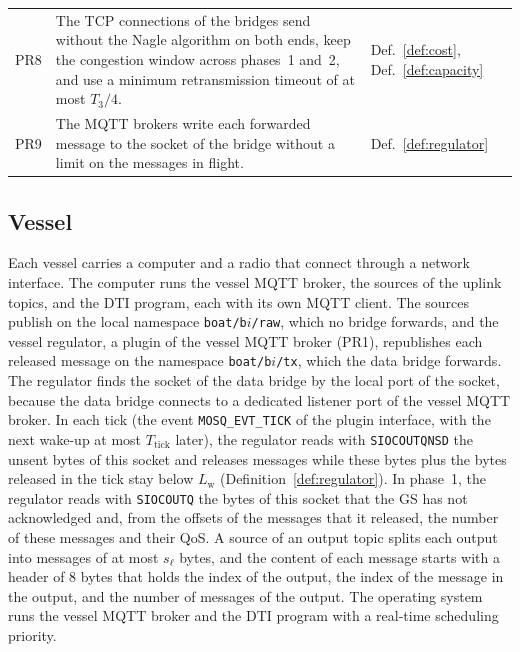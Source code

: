 \begin{table}[t]
\begin{tabular}{@{}lp{5.4cm}l@{}}
PR8 & The TCP connections of the bridges send without the Nagle algorithm on both ends, keep the congestion window across phases~1 and~2, and use a minimum retransmission timeout of at most $T_3/4$. & Def.~\ref{def:cost}, Def.~\ref{def:capacity} \\
PR9 & The MQTT brokers write each forwarded message to the socket of the bridge without a limit on the messages in flight. & Def.~\ref{def:regulator} \\
\bottomrule
\end{tabular}
\end{table}

\subsection{Vessel}\label{subsec:plat_vessel}
Each vessel carries a computer and a radio that connect through a network interface. The computer runs the vessel MQTT broker, the sources of the uplink topics, and the DTI program, each with its own MQTT client. The sources publish on the local namespace \texttt{boat/b$i$/raw}, which no bridge forwards, and the vessel regulator, a plugin of the vessel MQTT broker (PR1), republishes each released message on the namespace \texttt{boat/b$i$/tx}, which the data bridge forwards. The regulator finds the socket of the data bridge by the local port of the socket, because the data bridge connects to a dedicated listener port of the vessel MQTT broker. In each tick (the event \texttt{MOSQ\_EVT\_TICK} of the plugin interface, with the next wake-up at most $T_{\mathrm{tick}}$ later), the regulator reads with \texttt{SIOCOUTQNSD} the unsent bytes of this socket and releases messages while these bytes plus the bytes released in the tick stay below $L_{\mathrm{w}}$ (Definition~\ref{def:regulator}). In phase~1, the regulator reads with \texttt{SIOCOUTQ} the bytes of this socket that the GS has not acknowledged and, from the offsets of the messages that it released, the number of these messages and their QoS. A source of an output topic splits each output into messages of at most $s_\ell$ bytes, and the content of each message starts with a header of 8 bytes that holds the index of the output, the index of the message in the output, and the number of messages of the output. The operating system runs the vessel MQTT broker and the DTI program with a real-time scheduling priority.

